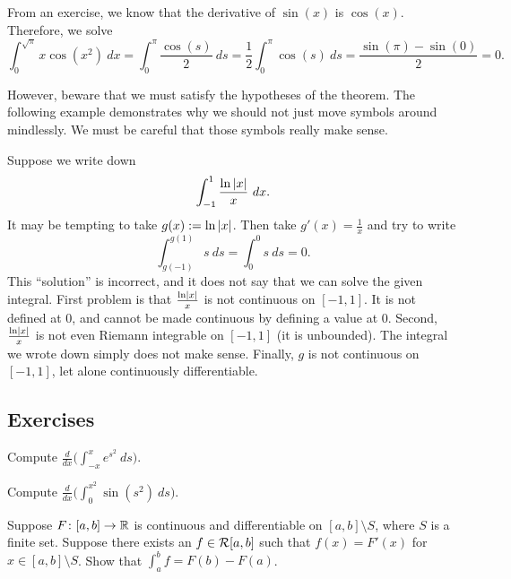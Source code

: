 \begin{example}
From an exercise, we know that the derivative of $\sin(x)$ is $\cos(x)$.
Therefore, we solve
\begin{equation*}
\int_0^{\sqrt{\pi}} x \cos(x^2) ~ dx = \int_0^\pi \frac{\cos(s)}{2} ~ ds
=
\frac{1}{2}
\int_0^\pi \cos(s) ~ ds
=
\frac{
\sin(\pi) - \sin(0)
}{2}
=
0 .
\end{equation*}
\end{example}

However, beware that we must satisfy the hypotheses of the theorem.  The
following example demonstrates why we should not just 
move symbols around mindlessly.
We must be careful that those symbols really make sense.

\begin{example}
Suppose we write down
\begin{equation*}
\int_{-1}^{1} \frac{\ln \left\lvert {x} \right\rvert}{x} ~dx .
\end{equation*}
It may be tempting to take $g(x) := \ln \left\lvert {x} \right\rvert$.  Then take $g'(x) =
\frac{1}{x}$ and try to write
\begin{equation*}
\int_{g(-1)}^{g(1)} s ~ds = 
\int_{0}^{0} s ~ds = 0. 
\end{equation*}
This ``solution'' is incorrect, and it does not say
that we can solve the given integral.  First problem is that
$\frac{\ln \left\lvert {x} \right\rvert}{x}$ is not continuous on $[-1,1]$.
It is not defined at 0, and cannot be made continuous by defining a value at
0.
Second, $\frac{\ln \left\lvert {x} \right\rvert}{x}$ is not even Riemann integrable on $[-1,1]$
(it is unbounded).
The integral we wrote down simply does not make sense.
Finally, $g$ is not continuous 
on $[-1,1]$, let alone continuously differentiable.
\end{example}

\subsection{Exercises}

\begin{exercise}
Compute
$\displaystyle
\frac{d}{dx} \biggl( \int_{-x}^x e^{s^2}~ds \biggr)$.
\end{exercise}

\begin{exercise}
Compute
$\displaystyle
\frac{d}{dx} \biggl( \int_{0}^{x^2} \sin(s^2)~ds \biggr)$.
\end{exercise}

\begin{exercise}
Suppose $F \colon [a,b] \to {\mathbb{R}}$ is continuous and differentiable
on $[a,b] \setminus S$, where $S$ is a finite set.  Suppose there
exists an $f \in {\mathcal{R}}[a,b]$ such that $f(x) = F'(x)$ for $x \in [a,b]
\setminus S$.  Show that
$\int_a^b f = F(b)-F(a)$.
\end{exercise}

